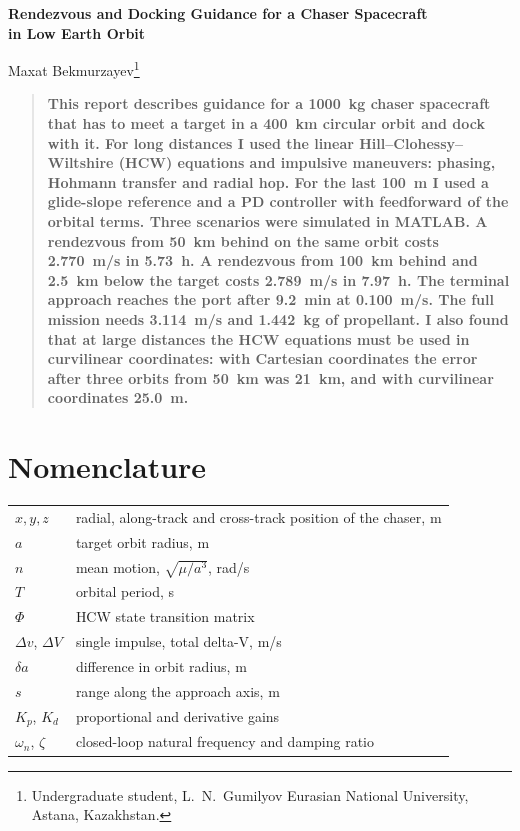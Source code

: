 \documentclass[letterpaper,10pt]{article}
\begin{document}
\begin{center}
{\LARGE\bfseries Rendezvous and Docking Guidance for a Chaser Spacecraft\\[2pt]
in Low Earth Orbit\par}
\vspace{12pt}
{\large Maxat Bekmurzayev\footnote{Undergraduate student, L.~N.~Gumilyov Eurasian National University, Astana, Kazakhstan.}\par}
\end{center}

\vspace{6pt}
\begin{quote}
\bfseries
This report describes guidance for a \SI{1000}{kg} chaser spacecraft that
has to meet a target in a \SI{400}{km} circular orbit and dock with it.
For long distances I used the linear Hill--Clohessy--Wiltshire (HCW) equations
and impulsive maneuvers: phasing, Hohmann transfer and radial hop. For the
last \SI{100}{m} I used a glide-slope reference and a PD controller with
feedforward of the orbital terms. Three scenarios were simulated in MATLAB. A
rendezvous from \SI{50}{km} behind on the same orbit costs
\SI{2.770}{m/s} in \SI{5.73}{h}. A rendezvous from
\SI{100}{km} behind and \SI{2.5}{km} below the target costs
\SI{2.789}{m/s} in \SI{7.97}{h}. The terminal approach reaches the port
after \SI{9.2}{min} at \SI{0.100}{m/s}. The full mission needs
\SI{3.114}{m/s} and \SI{1.442}{kg} of propellant. I also found that at large
distances the HCW equations must be used in curvilinear coordinates: with
Cartesian coordinates the error after three orbits from \SI{50}{km} was
\SI{21}{km}, and with curvilinear coordinates \SI{25.0}{m}.
\end{quote}

\section*{Nomenclature}
\begin{tabular}{@{}l@{\hspace{1.2em}=\hspace{1.2em}}l@{}}
$x, y, z$ & radial, along-track and cross-track position of the chaser, m \\
$a$ & target orbit radius, m \\
$n$ & mean motion, $\sqrt{\mu/a^3}$, rad/s \\
$T$ & orbital period, s \\
$\Phi$ & HCW state transition matrix \\
$\Delta v$, $\Delta V$ & single impulse, total delta-V, m/s \\
$\delta a$ & difference in orbit radius, m \\
$s$ & range along the approach axis, m \\
$K_p$, $K_d$ & proportional and derivative gains \\
$\omega_n$, $\zeta$ & closed-loop natural frequency and damping ratio \\
\end{tabular}
\end{document}
